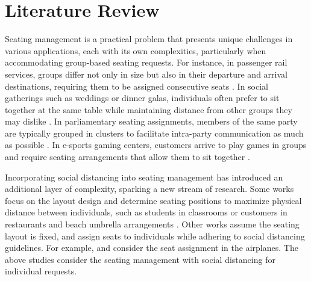 \section{Literature Review}\label{literature}

Seating management is a practical problem that presents unique challenges in various applications, each with its own complexities, particularly when accommodating group-based seating requests. For instance, in passenger rail services, groups differ not only in size but also in their departure and arrival destinations, requiring them to be assigned consecutive seats \citep{clausen2010off, deplano2019offline}. In social gatherings such as weddings or dinner galas, individuals often prefer to sit together at the same table while maintaining distance from other groups they may dislike \citep{lewis2016creating}. In parliamentary seating assignments, members of the same party are typically grouped in clusters to facilitate intra-party communication as much as possible \citep{vangerven2022parliament}. In e-sports gaming centers, customers arrive to play games in groups and require seating arrangements that allow them to sit together \citep{kwag2022optimal}.

Incorporating social distancing into seating management has introduced an additional layer of complexity, sparking a new stream of research. Some works focus on the layout design and determine seating positions to maximize physical distance between individuals, such as students in classrooms \citep{bortolete2022support} or customers in restaurants and beach umbrella arrangements \citep{fischetti2023safe}. Other works assume the seating layout is fixed, and assign seats to individuals while adhering to social distancing guidelines. For example, \citet{salari2020social} and \citet{pavlik2021airplane} consider the seat assignment in the airplanes. The above studies consider the seating management with social distancing for individual requests.


